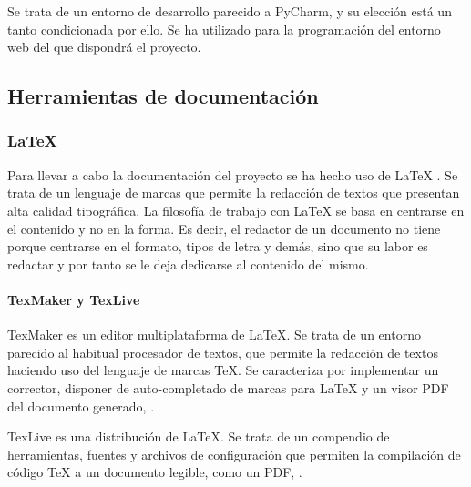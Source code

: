 Se trata de un entorno de desarrollo parecido a PyCharm, y su elección está un tanto condicionada por ello. Se ha utilizado para la programación del entorno web del que dispondrá el proyecto. 

\subsection{Herramientas de documentación}

\subsubsection{\LaTeX}

Para llevar a cabo la documentación del proyecto se ha hecho uso de \LaTeX{} \citep{wiki:latex}. Se trata de un lenguaje de marcas que permite la redacción de textos que presentan alta calidad tipográfica. La filosofía de trabajo con \LaTeX{} se basa en centrarse en el contenido y no en la forma. Es decir, el redactor de un documento no tiene porque centrarse en el formato, tipos de letra y demás, sino que su labor es redactar y por tanto se le deja dedicarse al contenido del mismo.

\paragraph{TexMaker y TexLive}
TexMaker es un editor multiplataforma de \LaTeX. Se trata de un entorno parecido al habitual procesador de textos, que permite la redacción de textos haciendo uso del lenguaje de marcas \TeX. Se caracteriza por implementar un corrector, disponer de auto-completado de marcas para \LaTeX{} y un visor PDF del documento generado, \citep{wiki:TexMaker}.

TexLive es una distribución de \LaTeX. Se trata de un compendio de herramientas, fuentes y archivos de configuración que permiten la compilación de código \TeX{} a un documento legible, como un PDF, \citep{wiki:TexLive}.






